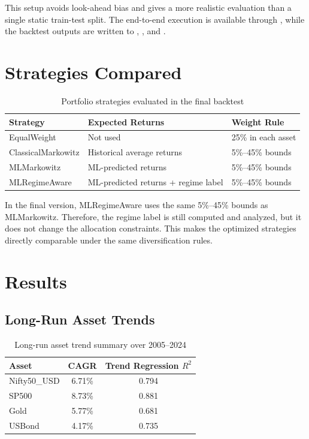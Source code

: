 \documentclass[11pt,a4paper]{article}
\begin{document}
This setup avoids look-ahead bias and gives a more realistic evaluation than a single static train-test split. The end-to-end execution is available through , while the backtest outputs are written to , , and .

\section{Strategies Compared}

\begin{table}[H]
\centering
\caption{Portfolio strategies evaluated in the final backtest}
\begin{tabular}{lll}
\toprule
\textbf{Strategy} & \textbf{Expected Returns} & \textbf{Weight Rule} \\
\midrule
EqualWeight & Not used & 25\% in each asset \\
ClassicalMarkowitz & Historical average returns & 5\%--45\% bounds \\
MLMarkowitz & ML-predicted returns & 5\%--45\% bounds \\
MLRegimeAware & ML-predicted returns + regime label & 5\%--45\% bounds \\
\bottomrule
\end{tabular}
\end{table}

In the final version, MLRegimeAware uses the same 5\%--45\% bounds as MLMarkowitz. Therefore, the regime label is still computed and analyzed, but it does not change the allocation constraints. This makes the optimized strategies directly comparable under the same diversification rules.

\section{Results}

\subsection{Long-Run Asset Trends}

\begin{table}[H]
\centering
\caption{Long-run asset trend summary over 2005--2024}
\begin{tabular}{lcc}
\toprule
\textbf{Asset} & \textbf{CAGR} & \textbf{Trend Regression \(R^2\)} \\
\midrule
Nifty50\_USD & 6.71\% & 0.794 \\
SP500 & 8.73\% & 0.881 \\
Gold & 5.77\% & 0.681 \\
USBond & 4.17\% & 0.735 \\
\bottomrule
\end{tabular}
\end{table}
\end{document}
